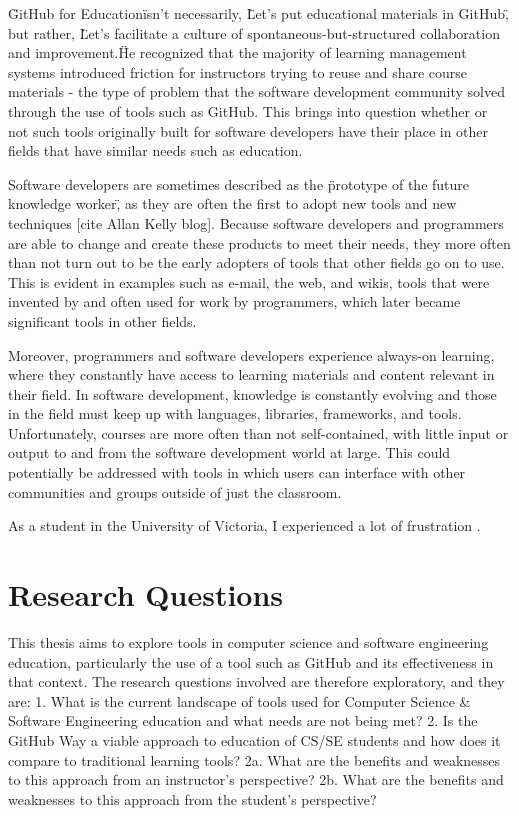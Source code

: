 \"GitHub for Education\" isn’t necessarily, \"Let’s put educational materials in GitHub\", but rather, \"Let’s facilitate a culture of spontaneous-but-structured collaboration and improvement.\"

He recognized that the majority of learning management systems introduced friction for instructors trying to reuse and share course materials - the type of problem that the software development community solved through the use of tools such as GitHub. This brings into question whether or not such tools originally built for software developers have their place in other fields that have similar needs such as education.

Software developers are sometimes described as the \"prototype of the future knowledge worker\", as they are often the first to adopt new tools and new techniques [cite Allan Kelly blog]. Because software developers and programmers are able to change and create these products to meet their needs, they more often than not turn out to be the early adopters of tools that other fields go on to use. This is evident in examples such as e-mail, the web, and wikis, tools that were invented by and often used for work by programmers, which later became significant tools in other fields.


Moreover, programmers and software developers experience always-on learning, where they constantly have access to learning materials and content relevant in their field. In software development, knowledge is constantly evolving and those in the field must keep up with languages, libraries, frameworks, and tools. Unfortunately, courses are more often than not self-contained, with little input or output to and from the software development world at large. This could potentially be addressed with tools in which users can interface with other communities and groups outside of just the classroom.

As a student in the University of Victoria, I experienced a lot of frustration .

\section{Research Questions}
This thesis aims to explore tools in computer science and software engineering education, particularly the use of a tool such as GitHub and its effectiveness in that context. The research questions involved are therefore exploratory, and they are:
1. What is the current landscape of tools used for Computer Science & Software Engineering education and what needs are not being met?
2. Is the GitHub Way a viable approach to education of CS/SE students and how does it compare to traditional learning tools?
2a. What are the benefits and weaknesses to this approach from an instructor's perspective?
2b. What are the benefits and weaknesses to this approach from the student's perspective?

